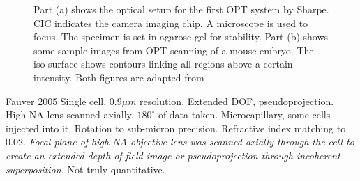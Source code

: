 \documentclass[12pt]{article}
\begin{document}
\begin{figure}[H]
\centering
{}
\caption{Part (a) shows the optical setup for the first OPT system by Sharpe. CIC indicates the camera imaging chip. A microscope is used to focus. The specimen is set in agarose gel for stability. Part (b) shows some sample images from OPT scanning of a mouse embryo. The iso-surface shows contours linking all regions above a certain intensity. Both figures are adapted from \cite{Sharpe:2002jp}}
\label{fig:SharpeOPT}
\end{figure}








Fauver 2005
\cite{Fauver:2005}
Single cell, $0.9\mu m$ resolution. Extended DOF, pseudoprojection. High NA lens scanned axially. $180^{\circ}$ of data taken. Microcapillary, some cells injected into it. Rotation to sub-micron precision. Refractive index matching to 0.02.
\textit{Focal plane of high NA objective lens was  scanned axially through the cell to create an extended depth of field image or pseudoprojection through incoherent superposition.} \cite{hausler1972method, Fauver:2005} Not truly quantitative.
\end{document}
